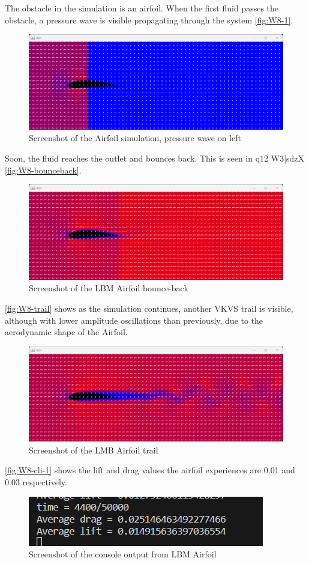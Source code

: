 The obstacle in the simulation is an airfoil. When the first fluid passes the obstacle, a pressure wave is visible propagating through the system \autoref{fig:W8-1}.
\begin{figure}[H] 
    \centering
    \includegraphics[width=0.6\columnwidth]{Figures/Week 8/1.png}
    \caption{Screenshot of the Airfoil simulation, pressure wave on left}
    \label{fig:W8-1}
\end{figure}
Soon, the fluid reaches the outlet and bounces back. This is seen in q12    W3|sdzX \autoref{fig:W8-bounceback}.
\begin{figure}[H]   
    \centering
    \includegraphics[width=0.49\columnwidth]{Figures/Week 8/bounceback.png}
    \caption{Screenshot of the LBM Airfoil bounce-back}
    \label{fig:W8-bounceback}
\end{figure}
\autoref{fig:W8-trail} shows as the simulation continues, another VKVS trail is visible, although with lower amplitude oscillations than previously, due to the aerodynamic shape of the Airfoil.
\begin{figure}[H] 
    \centering
    \includegraphics[width=0.49\columnwidth]{Figures/Week 8/trail.png}
    \caption{Screenshot of the LMB Airfoil trail}
    \label{fig:W8-trail}
\end{figure}

\autoref{fig:W8-cli-1} shows the lift and drag values the airfoil experiences are 0.01 and 0.03 respectively.
\begin{figure}[H] 
    \centering
    \includegraphics[width=0.49\columnwidth]{Figures/Week 8/cli.png}
    \caption{Screenshot of the console output from LBM Airfoil }
    \label{fig:W8-cli-1}
\end{figure}

